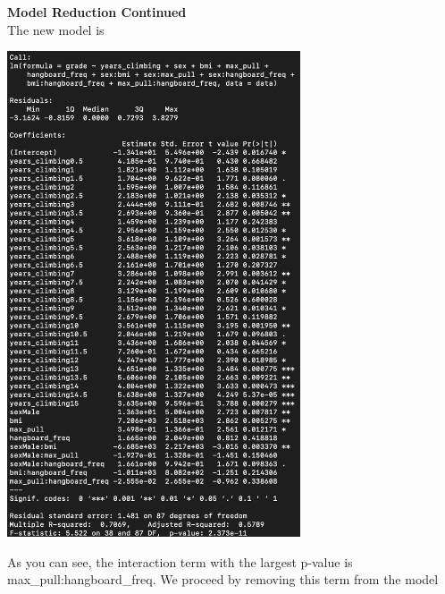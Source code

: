 \documentclass[11pt]{amsart}
\begin{document}
\newpage
{\bf Model Reduction Continued}\\
The new model is\\
\begin{center}
\includegraphics[width=0.65\textwidth]{mod2}
\end{center}
\vspace{0.15in}
As you can see, the interaction term with the largest p-value is max\_pull:hangboard\_freq.
We proceed by removing this term from the model
\end{document}
